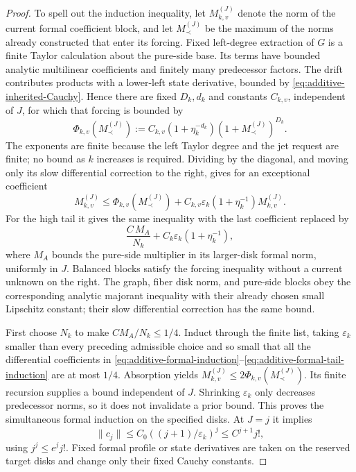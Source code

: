 \begin{proof}
To spell out the induction inequality, let $M_{k,v}^{(J)}$ denote the
norm of the current formal coefficient block, and let $M_{\prec}^{(J)}$
be the maximum of the norms already constructed that enter its
forcing.  Fixed left-degree extraction of $G$ is a finite Taylor
calculation about the pure-side base.  Its terms have bounded analytic
multilinear coefficients and finitely many predecessor factors.
The drift contributes products with a lower-left state derivative,
bounded by \eqref{eq:additive-inherited-Cauchy}.  Hence there are fixed
$D_k,d_k$ and constants $C_{k,v}$, independent of $J$, for which that
forcing is bounded by
\[
 \Phi_{k,v}(M_{\prec}^{(J)})
 :=C_{k,v}(1+\eta_k^{-d_k})(1+M_{\prec}^{(J)})^{D_k}.
\]
The exponents are finite because the left Taylor degree and the jet
request are finite; no bound as $k$ increases is required.  Dividing
by the diagonal, and moving only its slow differential correction to
the right, gives for an exceptional coefficient
\begin{equation}\label{eq:additive-formal-induction}
 M_{k,v}^{(J)}\le
 \Phi_{k,v}(M_{\prec}^{(J)})+
 C_{k,v}\varepsilon_k(1+\eta_k^{-1})M_{k,v}^{(J)}.
\end{equation}
For the high tail it gives the same inequality with the last
coefficient replaced by
\begin{equation}\label{eq:additive-formal-tail-induction}
 \frac{C\,M_A}{N_k}
       +C_k\varepsilon_k(1+\eta_k^{-1}),
\end{equation}
where $M_A$ bounds the pure-side multiplier in its larger-disk formal
norm, uniformly in $J$.  Balanced blocks satisfy the forcing inequality
without a current unknown on the right.  The graph, fiber disk norm,
and pure-side blocks obey the corresponding analytic majorant
inequality with their already chosen small Lipschitz constant; their
slow differential correction has the same bound.

First choose $N_k$ to make $CM_A/N_k\le1/4$.  Induct through the finite
list, taking $\varepsilon_k$ smaller than every preceding admissible
choice and so small that all the differential coefficients in
\eqref{eq:additive-formal-induction}--\eqref{eq:additive-formal-tail-induction}
are at most $1/4$.  Absorption yields
$M_{k,v}^{(J)}\le2\Phi_{k,v}(M_{\prec}^{(J)})$.
Its finite recursion supplies a bound independent of $J$.
Shrinking $\varepsilon_k$ only decreases predecessor norms, so it
does not invalidate a prior bound.  This proves the simultaneous
formal induction on the specified disks.  At $J=j$ it implies
\[
 \|c_j\|\le C_0((j+1)/\varepsilon_k)^j
          \le C^{j+1}j!,
\]
using $j^j\le e^jj!$.  Fixed formal profile or state derivatives are
taken on the reserved target disks and change only their fixed
Cauchy constants.


\end{proof}
